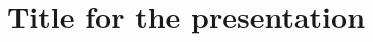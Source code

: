 \documentclass[xcolor=dvipsnames]{beamer}
\title{Title for the presentation}
\date{}
\author[]{}
\institute[]{\textbf{\projectName}}
\begin{document}
	
	\begin{frame}[t]
		\titlepage
	\end{frame}
    
    \begin{frame}
        \tableofcontents{}
    \end{frame}
\end{document}
